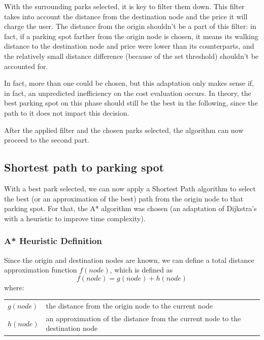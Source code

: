 \documentclass[a4paper, 12pt]{report}
\makeatletter
\newenvironment{conditions}
  {\par\vspace{\abovedisplayskip}\noindent\begin{tabular}{>{$}l<{$} @{${}={}$} l}}
  {\end{tabular}\par\vspace{\belowdisplayskip}}
\makeatother
\begin{document}
    \pagebreak
    
    With the surrounding parks selected, it is key to filter them down. This filter takes into account the distance from the destination node and the price it will charge the user. The distance from the origin shouldn't be a part of this filter: in fact, if a parking spot farther from the origin node is chosen, it means its walking distance to the destination node and price were lower than its counterparts, and the relatively small distance difference (because of the set threshold) shouldn't be accounted for. 
    
    In fact, more than one could be chosen, but this adaptation only makes sense if, in fact, an unpredicted inefficiency on the cost evaluation occurs. In theory, the best parking spot on this phase should still be the best in the following, since the path to it does not impact this decision.
    
    After the applied filter and the chosen parks selected, the algorithm can now proceed to the second part.
    
    \subsection{Shortest path to parking spot} \label{selectpath}
    
    With a best park selected, we can now apply a Shortest Path algorithm to select the best (or an approximation of the best) path from the origin node to that parking spot. For that, the A* algorithm was chosen (an adaptation of Dijkstra's with a heuristic to improve time complexity).
    
    \subsubsection{A* Heuristic Definition} \label{aheuristic}
    
    Since the origin and destination nodes are known, we can define a total distance approximation function $f(node)$, which is defined as
    \begin{equation}
        f(node) = g(node) + h(node)
    \end{equation}
    where:
    \begin{conditions}
        g(node) & the distance from the origin node to the current node \\
        h(node) & an approximation of the distance from the current node to the destination node \\
    \end{conditions}
    
\end{document}
